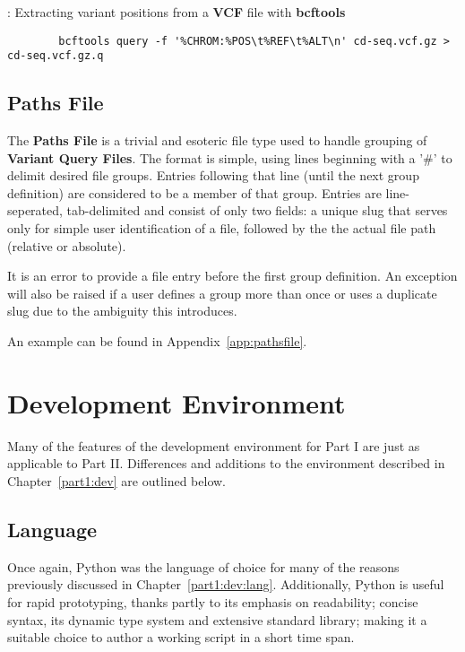\begin{listing}[H]
    \caption[bquery]{: Extracting variant positions from a \textbf{VCF} file
    with \textbf{bcftools}}
    \label{list:bquery}
    \begin{verbatim}
        bcftools query -f '%CHROM:%POS\t%REF\t%ALT\n' cd-seq.vcf.gz > cd-seq.vcf.gz.q
    \end{verbatim}
\end{listing}



\subsection{Paths File}
\label{sec:pathsfile}

The \textbf{Paths File} is a trivial and esoteric file type used to handle
grouping of \textbf{Variant Query Files}. The format is simple, using lines
beginning with a '\#' to delimit desired file groups. Entries following that
line (until the next group definition) are considered to be a member of that
group. Entries are line-seperated, tab-delimited and consist of only two fields:
a unique slug that serves only for simple user identification of a file,
followed by the the actual file path (relative or absolute).

It is an error to provide a file entry before the first group definition. An
exception will also be raised if a user defines a group more than once or uses a
duplicate slug due to the ambiguity this introduces.

An example can be found in Appendix~\ref{app:pathsfile}.


\section{Development Environment}

Many of the features of the development environment for Part I are just as
applicable to Part II. Differences and additions to the environment described in
Chapter~\ref{part1:dev} are outlined below.

\subsection{Language}

Once again, Python was the language of choice for many of the reasons previously
discussed in Chapter~\ref{part1:dev:lang}. Additionally, Python is useful for
rapid prototyping, thanks partly to its emphasis on readability; concise
syntax, its dynamic type system and extensive standard library; making it a
suitable choice to author a working script in a short time span.

